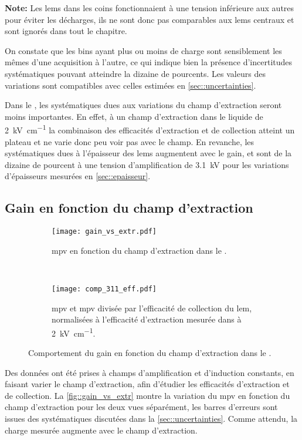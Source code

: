         \textbf{Note:} Les \glspl{lem} dans les coins fonctionnaient à une tension inférieure aux autres pour éviter les décharges, ils ne sont donc pas comparables aux \glspl{lem} centraux et sont ignorés dans tout le chapitre.
    
        On constate que les bins ayant plus ou moins de charge sont sensiblement les mêmes d'une acquisition à l'autre, ce qui indique bien la présence d'incertitudes systématiques pouvant atteindre la dizaine de pourcents. Les valeurs des variations sont compatibles avec celles estimées en \autoref{sec::uncertainties}.

        Dans le \SSS{}, les systématiques dues aux variations du champ d'extraction seront moins importantes. En effet, à un champ d'extraction dans le liquide de \SI{2}{\kilo\volt\per\centi\meter} la combinaison des efficacités d'extraction et de collection atteint un plateau et ne varie donc peu voir pas avec le champ. En revanche, les systématiques dues à l'épaisseur des \glspl{lem} augmentent avec le gain, et sont de la dizaine de pourcent à une tension d'amplification de \SI{3.1}{\kilo\volt} pour les variations d'épaisseurs mesurées en \autoref{sec::epaisseur}.

    \subsection{Gain en fonction du champ d'extraction}\label{sec::result_extr}


      \begin{figure}[htbp]
        \centering
        \begin{subfigure}[t]{0.9\textwidth}
          \centering
          \texttt{[image: gain\_vs\_extr.pdf]}
        \caption{\label{fig::gain_vs_extr}\gls{mpv} en fonction du champ d'extraction dans le \TOO{}.}
        \end{subfigure}\\
        \begin{subfigure}[t]{0.9\textwidth}
          \centering
          \texttt{[image: comp\_311\_eff.pdf]}
          \caption{\label{fig::comp_311_eff}\gls{mpv} et \gls{mpv} divisée par l'efficacité de collection du \gls{lem}, normalisées à l'efficacité d'extraction mesurée dans \cite{guschin} à \SI{2}{\kilo\volt\per\centi\meter}.}
        \end{subfigure}
        \caption[Comportement du gain en fonction du champ d'extraction dans le \TOO{}]{Comportement du gain en fonction du champ d'extraction dans le \TOO{}.}
      \end{figure}
      Des données ont été prises à champs d'amplification et d'induction constants, en faisant varier le champ d'extraction, afin d'étudier les efficacités d'extraction et de collection. La \autoref{fig::gain_vs_extr} montre la variation du \gls{mpv} en fonction du champ d'extraction pour les deux vues séparément, les barres d'erreurs sont issues des systématiques discutées dans la \autoref{sec::uncertainties}. Comme attendu, la charge mesurée augmente avec le champ d'extraction.

